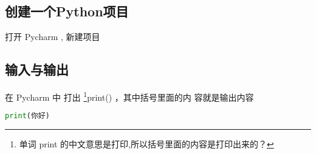 
\subsection{创建一个Python项目}

打开 Pycharm , 新建项目


\subsection{输入与输出}

在 Pycharm 中 打出 \footnote{单词 print 的中文意思是打印,所以括号里面的内容是打印出来的？}print() ，其中括号里面的内
容就是输出内容 

\begin{lstlisting}[language=python]
print(你好)
\end{lstlisting}
